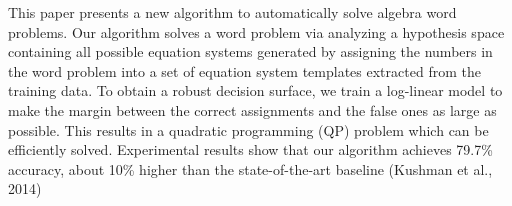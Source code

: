 This paper presents a new algorithm to automatically solve algebra word problems. Our algorithm solves a word problem via analyzing a hypothesis space containing all possible equation systems generated by assigning the numbers in the word problem into a set of equation system templates extracted from the training data. To obtain a robust decision surface, we train a log-linear model to make the margin between the correct assignments and the false ones as large as possible. This results in a quadratic programming (QP) problem which can be efficiently solved. Experimental results show that our algorithm achieves 79.7\% accuracy, about 10\% higher than the state-of-the-art baseline (Kushman et al., 2014)
